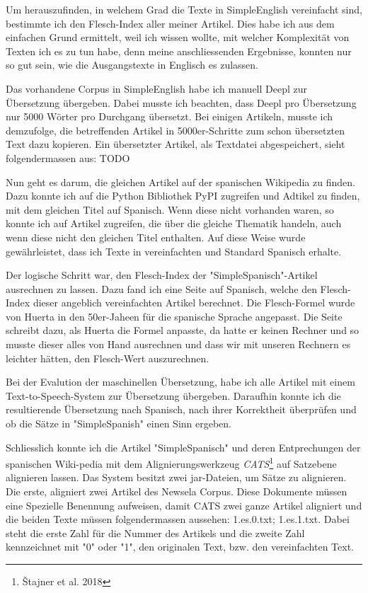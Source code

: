 \documentclass[11pt]{article}
\begin{document}
Um herauszufinden, in welchem Grad die Texte in SimpleEnglish vereinfacht sind, bestimmte ich den Flesch-Index aller meiner Artikel. Dies habe ich aus dem einfachen Grund ermittelt, weil ich wissen wollte, mit welcher Komplexität von Texten ich es zu tun habe, denn meine anschliessenden Ergebnisse, konnten nur so gut sein, wie die Ausgangstexte in Englisch es zulassen.

Das vorhandene Corpus in SimpleEnglish habe ich manuell Deepl zur Übersetzung übergeben. Dabei musste ich beachten, dass Deepl pro Übersetzung nur 5000 Wörter pro Durchgang übersetzt. Bei einigen Artikeln, musste ich demzufolge, die betreffenden Artikel in 5000er-Schritte zum schon übersetzten Text dazu kopieren. Ein übersetzter Artikel, als Textdatei abgespeichert, sieht folgendermassen aus: TODO

Nun geht es darum, die gleichen Artikel auf der spanischen Wikipedia zu finden. Dazu konnte ich auf die Python Bibliothek PyPI zugreifen und Adtikel zu finden, mit dem gleichen Titel auf Spanisch. Wenn diese nicht vorhanden waren, so konnte ich auf Artikel zugreifen, die über die gleiche Thematik handeln, auch wenn diese nicht den gleichen Titel enthalten. Auf diese Weise wurde gewährleistet, dass ich Texte in vereinfachten und Standard Spanisch erhalte.

Der logische Schritt war, den Flesch-Index der "SimpleSpanisch"-Artikel ausrechnen zu lassen. Dazu fand ich eine Seite auf Spanisch, welche den Flesch-Index dieser angeblich vereinfachten Artikel berechnet. Die Flesch-Formel wurde von Huerta in den 50er-Jaheen für die spanische Sprache angepasst. Die Seite schreibt dazu, als Huerta die Formel anpasste, da hatte er keinen Rechner und so musste dieser alles von Hand ausrechnen und dass wir mit unseren Rechnern es leichter hätten, den Flesch-Wert auszurechnen.

Bei der Evalution der maschinellen Übersetzung, habe ich alle Artikel mit einem Text-to-Speech-System zur Übersetzung übergeben. Daraufhin konnte ich die resultierende Übersetzung nach Spanisch, nach ihrer Korrektheit überprüfen und ob die Sätze in "SimpleSpanish" einen Sinn ergeben. 

Schliesslich konnte ich die Artikel "SimpleSpanisch" und deren Entprechungen der spanischen Wiki-pedia mit dem Alignierungswerkzeug \textit{CATS}\footnote{Štajner et al. 2018}  auf Satzebene alignieren lassen. Das System besitzt zwei jar-Dateien, um Sätze zu alignieren. Die erste, aligniert zwei Artikel des Newsela Corpus. Diese Dokumente müssen eine Spezielle Benennung aufweisen, damit CATS zwei ganze Artikel aligniert und die beiden Texte müssen folgendermassen aussehen: 1.es.0.txt; 1.es.1.txt. Dabei steht die erste Zahl für die Nummer des Artikels und die zweite Zahl kennzeichnet mit "0" oder "1", den originalen Text, bzw. den vereinfachten Text.
\end{document}
